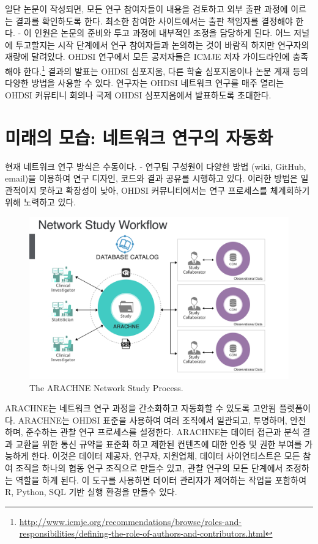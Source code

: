 \documentclass[11pt]{book}
\let\rmarkdownfootnote\footnote%
\def\footnote{\protect\rmarkdownfootnote}
\theoremstyle{definition}
\theoremstyle{definition}
\theoremstyle{definition}
\theoremstyle{remark}
\begin{document}
일단 논문이 작성되면, 모든 연구 참여자들이 내용을 검토하고 외부 출판
과정에 이르는 결과를 확인하도록 한다. 최소한 참여한 사이트에서는 출판
책임자를 결정해야 한다. - 이 인원은 논문의 준비와 투고 과정에 내부적인
조정을 담당하게 된다. 어느 저널에 투고할지는 시작 단계에서 연구
참여자들과 논의하는 것이 바람직 하지만 연구자의 재량에 달려있다. OHDSI
연구에서 모든 공저자들은 ICMJE 저자 가이드라인에 충족해야
한다.\footnote{\url{http://www.icmje.org/recommendations/browse/roles-and-responsibilities/defining-the-role-of-authors-and-contributors.html}}
결과의 발표는 OHDSI 심포지움, 다른 학술 심포지움이나 논문 게재 등의
다양한 방법을 사용할 수 있다. 연구자는 OHDSI 네트워크 연구를 매주 열리는
OHDSI 커뮤티니 회의나 국제 OHDSI 심포지움에서 발표하도록 초대한다.

\section{미래의 모습: 네트워크 연구의 자동화}\label{----}


현재 네트워크 연구 방식은 수동이다. - 연구팀 구성원이 다양한 방법 (wiki,
GitHub, email)을 이용하여 연구 디자인, 코드와 결과 공유를 시행하고 있다.
이러한 방법은 일관적이지 못하고 확장성이 낮아, OHDSI 커뮤니티에서는 연구
프로세스를 체계회하기 위해 노력하고 있다.

\begin{figure}[h]

{\centering \includegraphics[width=0.9\linewidth]{images/NetworkStudies/ARACHNE} 

}

\caption{The ARACHNE Network Study Process.}\label{fig:arachne}
\end{figure}

ARACHNE는 네트워크 연구 과정을 간소화하고 자동화할 수 있도록 고안됨
플렛폼이다. ARACHNE는 OHDSI 표준을 사용하여 여러 조직에서 일관되고,
투명하며, 안전하며, 준수하는 관찰 연구 프로세스를 설정한다. ARACHNE는
데이터 접근과 분석 결과 교환을 위한 통신 규약을 표준화 하고 제한된
컨텐츠에 대한 인증 및 권한 부여를 가능하게 한다. 이것은 데이터 제공자,
연구자, 지원업체, 데이터 사이언티스트은 모든 참여 조직을 하나의 협동
연구 조직으로 만들수 있고, 관찰 연구의 모든 단계에서 조정하는 역할을
하게 된다. 이 도구를 사용하면 데이터 관리자가 제어하는 작업을 포함하여
R, Python, SQL 기반 실행 환경을 만들수 있다.
\end{document}
